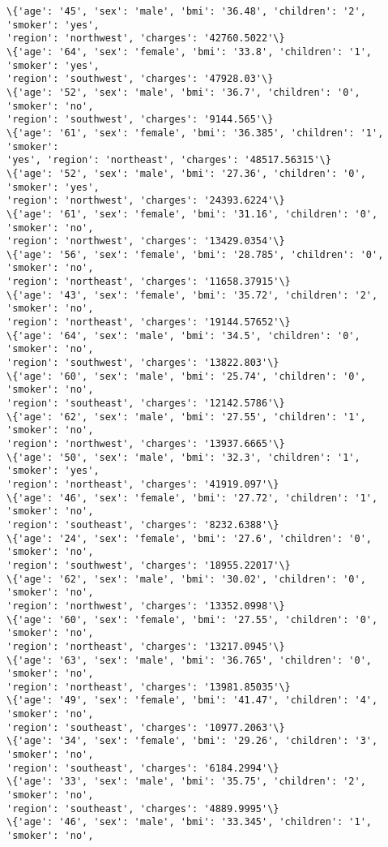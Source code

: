 \documentclass[11pt]{article}
\begin{document}
\begin{Verbatim}[commandchars=\\\{\}]
\{'age': '45', 'sex': 'male', 'bmi': '36.48', 'children': '2', 'smoker': 'yes',
'region': 'northwest', 'charges': '42760.5022'\}
\{'age': '64', 'sex': 'female', 'bmi': '33.8', 'children': '1', 'smoker': 'yes',
'region': 'southwest', 'charges': '47928.03'\}
\{'age': '52', 'sex': 'male', 'bmi': '36.7', 'children': '0', 'smoker': 'no',
'region': 'southwest', 'charges': '9144.565'\}
\{'age': '61', 'sex': 'female', 'bmi': '36.385', 'children': '1', 'smoker':
'yes', 'region': 'northeast', 'charges': '48517.56315'\}
\{'age': '52', 'sex': 'male', 'bmi': '27.36', 'children': '0', 'smoker': 'yes',
'region': 'northwest', 'charges': '24393.6224'\}
\{'age': '61', 'sex': 'female', 'bmi': '31.16', 'children': '0', 'smoker': 'no',
'region': 'northwest', 'charges': '13429.0354'\}
\{'age': '56', 'sex': 'female', 'bmi': '28.785', 'children': '0', 'smoker': 'no',
'region': 'northeast', 'charges': '11658.37915'\}
\{'age': '43', 'sex': 'female', 'bmi': '35.72', 'children': '2', 'smoker': 'no',
'region': 'northeast', 'charges': '19144.57652'\}
\{'age': '64', 'sex': 'male', 'bmi': '34.5', 'children': '0', 'smoker': 'no',
'region': 'southwest', 'charges': '13822.803'\}
\{'age': '60', 'sex': 'male', 'bmi': '25.74', 'children': '0', 'smoker': 'no',
'region': 'southeast', 'charges': '12142.5786'\}
\{'age': '62', 'sex': 'male', 'bmi': '27.55', 'children': '1', 'smoker': 'no',
'region': 'northwest', 'charges': '13937.6665'\}
\{'age': '50', 'sex': 'male', 'bmi': '32.3', 'children': '1', 'smoker': 'yes',
'region': 'northeast', 'charges': '41919.097'\}
\{'age': '46', 'sex': 'female', 'bmi': '27.72', 'children': '1', 'smoker': 'no',
'region': 'southeast', 'charges': '8232.6388'\}
\{'age': '24', 'sex': 'female', 'bmi': '27.6', 'children': '0', 'smoker': 'no',
'region': 'southwest', 'charges': '18955.22017'\}
\{'age': '62', 'sex': 'male', 'bmi': '30.02', 'children': '0', 'smoker': 'no',
'region': 'northwest', 'charges': '13352.0998'\}
\{'age': '60', 'sex': 'female', 'bmi': '27.55', 'children': '0', 'smoker': 'no',
'region': 'northeast', 'charges': '13217.0945'\}
\{'age': '63', 'sex': 'male', 'bmi': '36.765', 'children': '0', 'smoker': 'no',
'region': 'northeast', 'charges': '13981.85035'\}
\{'age': '49', 'sex': 'female', 'bmi': '41.47', 'children': '4', 'smoker': 'no',
'region': 'southeast', 'charges': '10977.2063'\}
\{'age': '34', 'sex': 'female', 'bmi': '29.26', 'children': '3', 'smoker': 'no',
'region': 'southeast', 'charges': '6184.2994'\}
\{'age': '33', 'sex': 'male', 'bmi': '35.75', 'children': '2', 'smoker': 'no',
'region': 'southeast', 'charges': '4889.9995'\}
\{'age': '46', 'sex': 'male', 'bmi': '33.345', 'children': '1', 'smoker': 'no',

\end{Verbatim}
\end{document}
